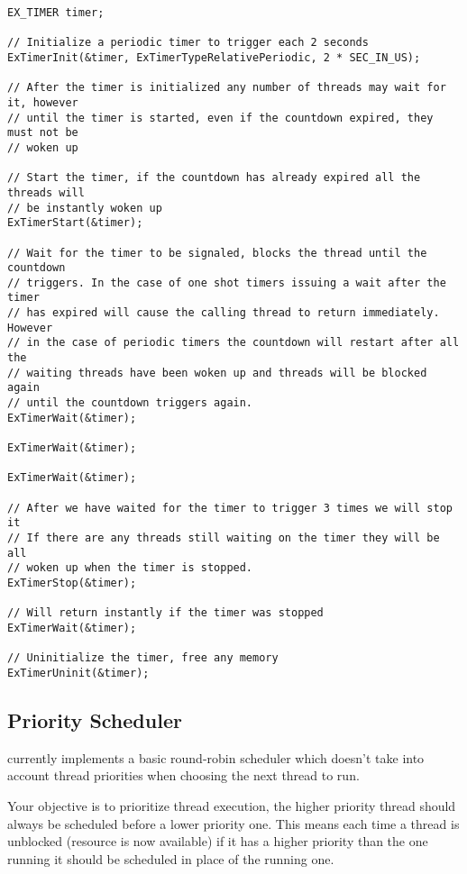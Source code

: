 \begin{lstlisting}[caption={Timer Usage Example},label={lst:TimerUsage}]
EX_TIMER timer;

// Initialize a periodic timer to trigger each 2 seconds
ExTimerInit(&timer, ExTimerTypeRelativePeriodic, 2 * SEC_IN_US);

// After the timer is initialized any number of threads may wait for it, however
// until the timer is started, even if the countdown expired, they must not be
// woken up

// Start the timer, if the countdown has already expired all the threads will
// be instantly woken up
ExTimerStart(&timer);

// Wait for the timer to be signaled, blocks the thread until the countdown
// triggers. In the case of one shot timers issuing a wait after the timer
// has expired will cause the calling thread to return immediately. However
// in the case of periodic timers the countdown will restart after all the
// waiting threads have been woken up and threads will be blocked again
// until the countdown triggers again.
ExTimerWait(&timer);

ExTimerWait(&timer);

ExTimerWait(&timer);

// After we have waited for the timer to trigger 3 times we will stop it
// If there are any threads still waiting on the timer they will be all
// woken up when the timer is stopped.
ExTimerStop(&timer);

// Will return instantly if the timer was stopped
ExTimerWait(&timer);

// Uninitialize the timer, free any memory
ExTimerUninit(&timer);
\end{lstlisting}

\subsection{Priority Scheduler}

\projectname  currently implements a basic round-robin scheduler which doesn't take into account
thread priorities when choosing the next thread to run.

Your objective is to prioritize thread execution, the higher priority thread should always be
scheduled before a lower priority one. This means each time a thread is unblocked (resource is now
available) if it has a higher priority than the one running it should be scheduled in place of the
running one.

